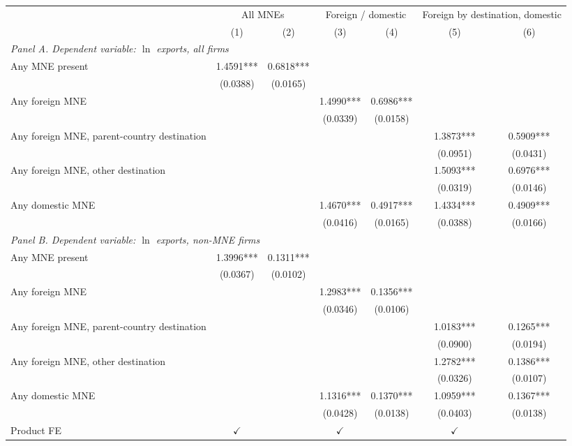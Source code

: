 \begin{tabular}{lcccccc} \hline
 & \multicolumn{2}{c}{All MNEs} & \multicolumn{2}{c}{Foreign / domestic} & \multicolumn{2}{c}{Foreign by destination, domestic} \\
 & (1) & (2) & (3) & (4) & (5) & (6) \\ \hline
\multicolumn{7}{l}{\textit{Panel A. Dependent variable: $\ln$ exports, all firms}} \\
Any MNE present & 1.4591*** & 0.6818*** &  &  &  &  \\
 & (0.0388) & (0.0165) &  &  &  &  \\
Any foreign MNE &  &  & 1.4990*** & 0.6986*** &  &  \\
 &  &  & (0.0339) & (0.0158) &  &  \\
Any foreign MNE, parent-country destination &  &  &  &  & 1.3873*** & 0.5909*** \\
 &  &  &  &  & (0.0951) & (0.0431) \\
Any foreign MNE, other destination &  &  &  &  & 1.5093*** & 0.6976*** \\
 &  &  &  &  & (0.0319) & (0.0146) \\
Any domestic MNE &  &  & 1.4670*** & 0.4917*** & 1.4334*** & 0.4909*** \\
 &  &  & (0.0416) & (0.0165) & (0.0388) & (0.0166) \\
\midrule
\multicolumn{7}{l}{\textit{Panel B. Dependent variable: $\ln$ exports, non-MNE firms}} \\
Any MNE present & 1.3996*** & 0.1311*** &  &  &  &  \\
 & (0.0367) & (0.0102) &  &  &  &  \\
Any foreign MNE &  &  & 1.2983*** & 0.1356*** &  &  \\
 &  &  & (0.0346) & (0.0106) &  &  \\
Any foreign MNE, parent-country destination &  &  &  &  & 1.0183*** & 0.1265*** \\
 &  &  &  &  & (0.0900) & (0.0194) \\
Any foreign MNE, other destination &  &  &  &  & 1.2782*** & 0.1386*** \\
 &  &  &  &  & (0.0326) & (0.0107) \\
Any domestic MNE &  &  & 1.1316*** & 0.1370*** & 1.0959*** & 0.1367*** \\
 &  &  & (0.0428) & (0.0138) & (0.0403) & (0.0138) \\
\hline
Product FE & $\checkmark$ &  & $\checkmark$ &  & $\checkmark$ &  \\

\end{tabular}
